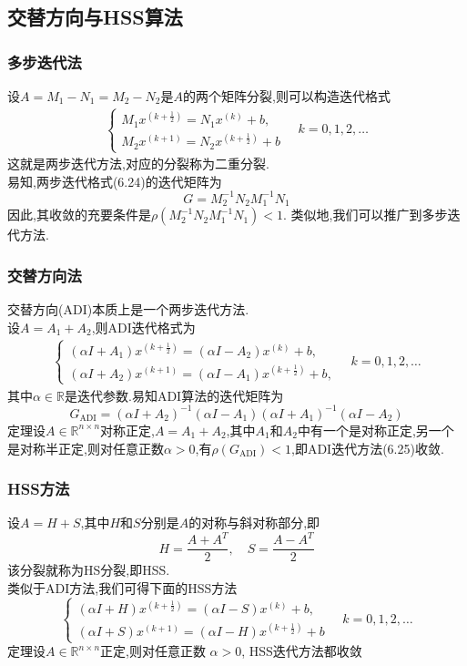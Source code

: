 \documentclass[12pt,a4paper]{article}
\begin{document}
\subsection{交替方向与HSS算法}
\subsubsection{多步迭代法}
设$A=M_{1}-N_{1}=M_{2}-N_{2}$是$A$的两个矩阵分裂,则可以构造迭代格式
\begin{align*}
\left\{\begin{array}{l}{M_{1} x^{\left(k+\frac{1}{2}\right)}=N_{1} x^{(k)}+b,} \\ {M_{2} x^{(k+1)}=N_{2} x^{\left(k+\frac{1}{2}\right)}+b}\end{array} \quad k=0,1,2, \ldots\right.
\tag{6.24}
\end{align*}
这就是两步迭代方法,对应的分裂称为二重分裂.\\
易知,两步迭代格式(6.24)的迭代矩阵为
$$
G=M_{2}^{-1} N_{2} M_{1}^{-1} N_{1}
$$
因此,其收敛的充要条件是$\rho\left(M_{2}^{-1} N_{2} M_{1}^{-1} N_{1}\right)<1$.
类似地,我们可以推广到多步迭代方法.
\subsubsection{交替方向法}
{\color{blue}交替方向(ADI)}本质上是一个两步迭代方法.\\
设$A=A_{1}+A_{2}$,则ADI迭代格式为
\begin{align*}
\left\{\begin{array}{l}{\left(\alpha I+A_{1}\right) x^{\left(k+\frac{1}{2}\right)}=\left(\alpha I-A_{2}\right) x^{(k)}+b,} \\ {\left(\alpha I+A_{2}\right) x^{(k+1)}=\left(\alpha I-A_{1}\right) x^{\left(k+\frac{1}{2}\right)}+b,}\end{array} \quad k=0,1,2, \ldots\right.
\tag{6.25}
\end{align*}
其中$\alpha \in \mathbb{R}$是迭代参数.易知ADI算法的迭代矩阵为
$$
G_{\mathrm{ADI}}=\left(\alpha I+A_{2}\right)^{-1}\left(\alpha I-A_{1}\right)\left(\alpha I+A_{1}\right)^{-1}\left(\alpha I-A_{2}\right)
$$
{\color{blue}定理}\qquad 设$A \in \mathbb{R}^{n \times n}$对称正定,$A=A_{1}+A_{2}$,其中$A_1$和$A_2$中有一个是对称正定,另一个是对称半正定,则对任意正数$\alpha>0$,有$\rho\left(G_{\mathrm{ADI}}\right)<1$,即ADI迭代方法(6.25)收敛.\\
\subsubsection{HSS方法}
设$A=H+S$,其中$H$和$S$分别是$A$的对称与斜对称部分,即
$$
H=\frac{A+A^{T}}{2}, \quad S=\frac{A-A^{T}}{2}
$$
该分裂就称为HS分裂,即HSS.\\
类似于ADI方法,我们可得下面的HSS方法\\
$$
\left\{\begin{array}{l}{(\alpha I+H) x^{\left(k+\frac{1}{2}\right)}=(\alpha I-S) x^{(k)}+b,} \\ {(\alpha I+S) x^{(k+1)}=(\alpha I-H) x^{\left(k+\frac{1}{2}\right)}+b}\end{array} \quad k=0,1,2, \ldots\right.
$$
{\color{blue}定理}\qquad 设$A \in \mathbb{R}^{n \times n}$正定,则对任意正数  $\alpha>0$, HSS迭代方法都收敛\\
\end{document}
